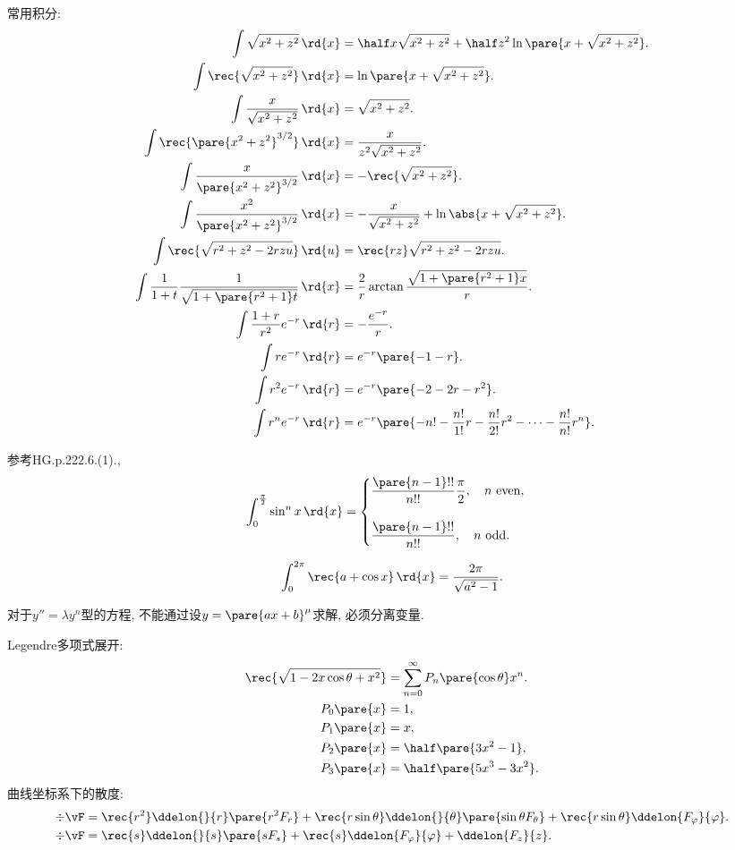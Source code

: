 \documentclass{ctexart}
\begin{document}
常用积分:
\begin{align*}
	\int \sqrt{x^2+z^2}\,\rd{x} &= \half x\sqrt{x^2+z^2} + \half z^2 \ln\pare{x+\sqrt{x^2+z^2}}. \\
	\int \rec{\sqrt{x^2+z^2}}\,\rd{x} &= \ln \pare{x+\sqrt{x^2+z^2}}.\\
	\int \frac{x}{\sqrt{x^2+z^2}}\,\rd{x} &= \sqrt{x^2+z^2}.\\
	\int \rec{\pare{x^2+z^2}^{3/2}}\,\rd{x} &= \frac{x}{z^2\sqrt{x^2+z^2}}.\\
	\int \frac{x}{\pare{x^2+z^2}^{3/2}}\,\rd{x} &= -\rec{\sqrt{x^2+z^2}}.\\
	\int \frac{x^2}{\pare{x^2+z^2}^{3/2}}\,\rd{x} &= -\frac{x}{\sqrt{x^2+z^2}} + \ln\abs{x+\sqrt{x^2+z^2}}.\\
	\int \rec{\sqrt{r^2+z^2-2rzu}}\,\rd{u} &= \rec{rz}\sqrt{r^2+z^2-2rzu}. \\
	\int \frac{1}{1+t}\frac{1}{\sqrt{1+\pare{r^2+1}t}}\,\rd{x} &= \frac{2}{r}\arctan\frac{\sqrt{1+\pare{r^2+1}x}}{r}.\\
	\int \frac{1+r}{r^2}e^{-r}\,\rd{r} &= -\frac{e^{-r}}{r}.\\
	\int re^{-r}\,\rd{r} &= e^{-r}\pare{-1-r}.\\
	\int r^2e^{-r}\,\rd{r} &= e^{-r}\pare{-2-2r-r^2}.\\
	\int r^n e^{-r}\,\rd{r} &= e^{-r}\pare{-n! - \frac{n!}{1!} r - \frac{n!}{2!} r^2 - \cdots - \frac{n!}{n!}r^n}.
\end{align*}
\begin{finale}
	参考HG.p.222.6.(1).,
	\[ \int_0^{\frac{\pi}{2}} \sin^n x\,\rd{x} = \begin{cases}
		\displaystyle \frac{\pare{n-1}!!}{n!!}\frac{\pi}{2},\quad n\ \mathrm{even},\\
		\\
		\displaystyle \frac{\pare{n-1}!!}{n!!},\quad n\ \mathrm{odd}.
	\end{cases} \]
\end{finale}
\begin{finale}
	\[ \int_0^{2\pi} \rec{a+\cos x}\,\rd{x} = \frac{2\pi}{\sqrt{a^2-1}}. \]
\end{finale}
\begin{pitfall}
	对于$y''=\lambda y^n$型的方程, 不能通过设$y=\pare{a x + b}^{\mu}$求解, 必须分离变量.
\end{pitfall}
Legendre多项式展开:
\begin{align*}
	\rec{\sqrt{1-2x\cos\theta+x^2}} &= \sum_{n=0}^\infty P_n\pare{\cos\theta}x^n. \\
	P_0\pare{x} &= 1,\\
	P_1\pare{x} &= x,\\
	P_2\pare{x} &= \half\pare{3x^2-1},\\
	P_3\pare{x} &= \half\pare{5x^3-3x^2}.
\end{align*}
曲线坐标系下的散度:
\begin{align*}
	\div\vF &= \rec{r^2}\ddelon{}{r}\pare{r^2F_r} + \rec{r\sin\theta} \ddelon{}{\theta}\pare{\sin\theta F_\theta} + \rec{r\sin\theta} \ddelon{F_\varphi}{\varphi}.\\
	\div\vF &= \rec{s}\ddelon{}{s}\pare{s F_s} + \rec{s}\ddelon{F_\varphi}{\varphi} + \ddelon{F_z}{z}.
\end{align*}
\end{document}
